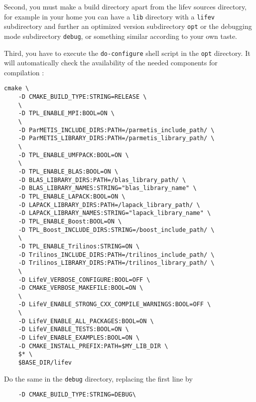 

Second, you must make a build directory apart from the 
lifev sources directory, for example in your home you can have a 
\verb!lib! directory with a \verb!lifev! subdirectory and further 
an optimized version subdirectory \verb!opt! or the debugging mode 
subdirectory \verb!debug!, or something similar according to your own taste.


Third, you have to execute the
\verb+do-configure+ shell script in the \verb!opt! directory.
It will automatically check the availability of the needed components
for \lifev compilation :


\begin{verbatim}
cmake \
    -D CMAKE_BUILD_TYPE:STRING=RELEASE \
    \
    -D TPL_ENABLE_MPI:BOOL=ON \
    \
    -D ParMETIS_INCLUDE_DIRS:PATH=/parmetis_include_path/ \
    -D ParMETIS_LIBRARY_DIRS:PATH=/parmetis_library_path/ \
    \
    -D TPL_ENABLE_UMFPACK:BOOL=ON \
    \
    -D TPL_ENABLE_BLAS:BOOL=ON \
    -D BLAS_LIBRARY_DIRS:PATH=/blas_library_path/ \
    -D BLAS_LIBRARY_NAMES:STRING="blas_library_name" \
    -D TPL_ENABLE_LAPACK:BOOL=ON \
    -D LAPACK_LIBRARY_DIRS:PATH=/lapack_library_path/ \
    -D LAPACK_LIBRARY_NAMES:STRING="lapack_library_name" \
    -D TPL_ENABLE_Boost:BOOL=ON \
    -D TPL_Boost_INCLUDE_DIRS:STRING=/boost_include_path/ \
    \
    -D TPL_ENABLE_Trilinos:STRING=ON \
    -D Trilinos_INCLUDE_DIRS:PATH=/trilinos_include_path/ \
    -D Trilinos_LIBRARY_DIRS:PATH=/trilinos_library_path/ \
    \
    -D LifeV_VERBOSE_CONFIGURE:BOOL=OFF \
    -D CMAKE_VERBOSE_MAKEFILE:BOOL=ON \
    \
    -D LifeV_ENABLE_STRONG_CXX_COMPILE_WARNINGS:BOOL=OFF \
    \
    -D LifeV_ENABLE_ALL_PACKAGES:BOOL=ON \
    -D LifeV_ENABLE_TESTS:BOOL=ON \
    -D LifeV_ENABLE_EXAMPLES:BOOL=ON \
    -D CMAKE_INSTALL_PREFIX:PATH=$MY_LIB_DIR \
    $* \
    $BASE_DIR/lifev
\end{verbatim}

Do the same in the \verb!debug! directory, replacing the first line by  \begin{verbatim}    -D CMAKE_BUILD_TYPE:STRING=DEBUG\  \end{verbatim}


